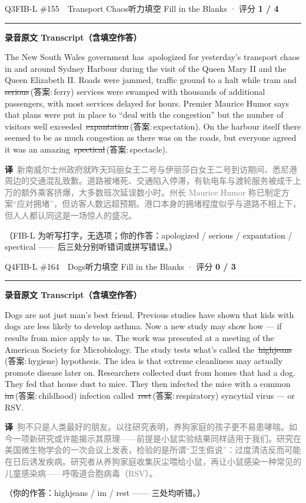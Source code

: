 \documentclass[11pt]{article}
\newcommand{\ptesub}[1]{%
  \par\needspace{2\baselineskip}\smallskip
  {\color{cAccent}\rule[-0.2ex]{3pt}{1.05em}}\hspace{6pt}%
  {\bfseries\color{cHead}#1}\par\nopagebreak\smallskip}
\newcommand{\zh}[1]{{\footnotesize\textcolor{cNote}{\textbf{译}}\ \textcolor{gray}{#1}}}
\newcommand{\rok}[1]{{\color{cFix}\ding{51}\,#1}}                 %
\newcommand{\rno}[2]{{\color{cWrong}\ding{55}\,\sout{#1}}\,{\footnotesize\color{cFix}(答案:\,#2)}}  %
\begin{document}
\begin{qblock}{Q3\quad FIB-L \#155\ \ Transport Chaos}{听力填空 Fill in the Blanks · 评分 \textcolor{cAccent}{\bfseries 1 / 4}}
\ptesub{录音原文 Transcript（含填空作答）}
\begin{promptbox}
The New South Wales government has \rok{apologized} for yesterday's transport chaos in and around Sydney Harbour during the visit of the Queen Mary II and the Queen Elizabeth II. Roads were jammed, traffic ground to a halt while tram and \rno{serious}{ferry} services were swamped with thousands of additional passengers, with most services delayed for hours. Premier Maurice Humor says that plans were put in place to ``deal with the congestion'' but the number of visitors well exceeded \rno{expantation}{expectation}. On the harbour itself there seemed to be as much congestion as there was on the roads, but everyone agreed it was an amazing \rno{spectical}{spectacle}.
\end{promptbox}
\zh{新南威尔士州政府就昨天玛丽女王二号与伊丽莎白女王二号到访期间、悉尼港周边的交通混乱致歉。道路被堵死、交通陷入停滞，有轨电车与渡轮服务被成千上万的额外乘客挤爆，大多数班次延误数小时。州长 Maurice Humor 称已制定方案“应对拥堵”，但访客人数远超预期。港口本身的拥堵程度似乎与道路不相上下，但人人都认同这是一场惊人的盛况。}
\par{\footnotesize\color{gray}（FIB-L 为听写打字，无选项；你的作答：apologized / serious / expantation / spectical —— 后三处分别听错词或拼写错误。）}
\end{qblock}

\begin{qblock}{Q4\quad FIB-L \#164\ \ Dogs}{听力填空 Fill in the Blanks · 评分 \textcolor{cAccent}{\bfseries 0 / 3}}
\ptesub{录音原文 Transcript（含填空作答）}
\begin{promptbox}
Dogs are not just man's best friend. Previous studies have shown that kids with dogs are less likely to develop asthma. Now a new study may show how --- if results from mice apply to us. The work was presented at a meeting of the American Society for Microbiology. The study tests what's called the \rno{highjeans}{hygiene} hypothesis. The idea is that extreme cleanliness may actually promote disease later on. Researchers collected dust from homes that had a dog. They fed that house dust to mice. They then infected the mice with a common \rno{im}{childhood} infection called \rno{rest}{respiratory} syncytial virus --- or RSV.
\end{promptbox}
\zh{狗不只是人类最好的朋友。以往研究表明，养狗家庭的孩子更不易患哮喘。如今一项新研究或许能揭示其原理——前提是小鼠实验结果同样适用于我们。研究在美国微生物学会的一次会议上发表，检验的是所谓“卫生假说”：过度清洁反而可能在日后诱发疾病。研究者从养狗家庭收集灰尘喂给小鼠，再让小鼠感染一种常见的儿童感染病——呼吸道合胞病毒（RSV）。}
\par{\footnotesize\color{gray}（你的作答：highjeans / im / rest —— 三处均听错。）}
\end{qblock}
\end{document}
